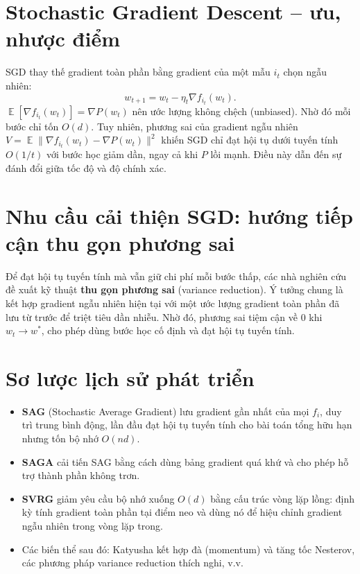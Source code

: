 \documentclass[12pt,a4paper]{report}
\theoremstyle{definition}
\DeclareMathOperator*{\E}{\mathbb{E}}
\begin{document}
\section{Stochastic Gradient Descent -- ưu, nhược điểm}
SGD thay thế gradient toàn phần bằng gradient của một mẫu $i_t$ chọn ngẫu nhiên:
\begin{equation}
w_{t+1} = w_t - \eta_t \nabla f_{i_t}(w_t).
\end{equation}
$\E[\nabla f_{i_t}(w_t)] = \nabla P(w_t)$ nên ước lượng không chệch (unbiased). Nhờ đó mỗi bước chỉ tốn $O(d)$. Tuy nhiên, phương sai của gradient ngẫu nhiên $V = \E\|\nabla f_{i_t}(w_t) - \nabla P(w_t)\|^2$ khiến SGD chỉ đạt hội tụ dưới tuyến tính $O(1/t)$ với bước học giảm dần, ngay cả khi $P$ lồi mạnh. Điều này dẫn đến sự đánh đổi giữa tốc độ và độ chính xác.

\section{Nhu cầu cải thiện SGD: hướng tiếp cận thu gọn phương sai}
Để đạt hội tụ tuyến tính mà vẫn giữ chi phí mỗi bước thấp, các nhà nghiên cứu đề xuất kỹ thuật \textbf{thu gọn phương sai} (variance reduction). Ý tưởng chung là kết hợp gradient ngẫu nhiên hiện tại với một ước lượng gradient toàn phần đã lưu từ trước để triệt tiêu dần nhiễu. Nhờ đó, phương sai tiệm cận về 0 khi $w_t \to w^*$, cho phép dùng bước học cố định và đạt hội tụ tuyến tính.

\section{Sơ lược lịch sử phát triển}
\begin{itemize}
    \item \textbf{SAG} (Stochastic Average Gradient) \citep{leroux2012stochastic,schmidt2017minimizing} lưu gradient gần nhất của mọi $f_i$, duy trì trung bình động, lần đầu đạt hội tụ tuyến tính cho bài toán tổng hữu hạn nhưng tốn bộ nhớ $O(n d)$.
    \item \textbf{SAGA} \citep{defazio2014saga} cải tiến SAG bằng cách dùng bảng gradient quá khứ và cho phép hỗ trợ thành phần không trơn.
    \item \textbf{SVRG} \citep{johnson2013accelerating} giảm yêu cầu bộ nhớ xuống $O(d)$ bằng cấu trúc vòng lặp lồng: định kỳ tính gradient toàn phần tại điểm neo và dùng nó để hiệu chỉnh gradient ngẫu nhiên trong vòng lặp trong.
    \item Các biến thể sau đó: Katyusha \citep{allen2017katyusha} kết hợp đà (momentum) và tăng tốc Nesterov, các phương pháp variance reduction thích nghi, v.v.
\end{itemize}
\end{document}
